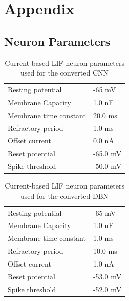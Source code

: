 \chapter{Appendix }

\section{Neuron Parameters}

\begin{table}[h!]
\caption{Current-based LIF neuron parameters used for the converted CNN}
\centering
\label{cnnlifparam}
\begin{tabular}{|ll|}
\hline
Resting potential    		& -65 mV 		    \\
Membrane Capacity    		& 1.0 nF 		     \\
Membrane time constant    	& 20.0 ms		             \\
Refractory period     		& 1.0 ms		                 \\
Offset current    			& 0.0 nA		              \\
Reset potential     		& -65.0 mV 	               \\
Spike threshold     		& -50.0 mV          \\\hline
\end{tabular}
\end{table}

\begin{table}[h!]
\caption{Current-based LIF neuron parameters used for the converted DBN}
\centering
\label{cubalifparam}
\begin{tabular}{|ll|}
\hline
Resting potential    		& -65 mV 		    \\
Membrane Capacity    		& 1.0 nF 		     \\
Membrane time constant    	& 1.0 ms		             \\
Refractory period     		& 10.0 ms		                 \\
Offset current    			& 1.0 nA		              \\
Reset potential     		& -53.0 mV 	               \\
Spike threshold     		& -52.0 mV          \\\hline
\end{tabular}
\end{table}


